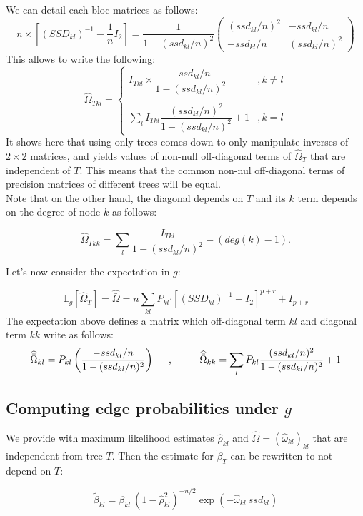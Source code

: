 \documentclass[11pt,a4paper]{article}
\newcommand{\Esp}{\mathds{E}}
\newcommand{\had}{\boldsymbol{\cdot}}
\begin{document}
We can detail each bloc matrices as follows:
\[
n\times [(SSD_{kl})^{-1} - \frac{1}{n}I_2] = \frac{1}{1-(ssd_{kl}/n)^2}
\left(\begin{array}{cc}
		(ssd_{kl}/n)^2   & -ssd_{kl}/n\\
		-ssd_{kl}/n& (ssd_{kl}/n)^2 
		\end{array}\right)
\]
This allows to write the following:
 \[ \boxed{\widehat{\Omega}_{Tkl}=\left\{\begin{array}{cl}I_{Tkl}
  \times\dfrac{ -ssd_{kl}/n}{1-(ssd_{kl}/n)^2} & ,k\neq l\\\\
 \sum_l I_{Tkl} \dfrac{(ssd_{kl}/n)^2}{1-(ssd_{kl}/n)^2} +1 & ,k=l
 \end{array}\right.
 }\]
It shows here that using only trees comes down to only manipulate inverses of $2\times 2$ matrices, and yields values of non-null off-diagonal terms of $\hat{\Omega}_T$ that are independent of $T$. This means that the common non-nul off-diagonal terms of precision matrices of different trees will be equal. \\

 Note that on the other hand, the diagonal depends on $T$ and its $k$ term depends on the degree of node $k$ as follows:

$$\widehat{\Omega}_{Tkk} =\sum_l \frac{I_{Tkl} }{1-(ssd_{kl}/n)^2} -(deg(k)-1).$$
 
Let's now consider the expectation in $g$:

$$\Esp_g[\widehat{\Omega}_T]= \widehat{\bar{\Omega}}= n\sum_{kl} P_{kl} \had [(SSD_{kl})^{-1} - I_2]^{p+r} + I_{p+r}$$
 The expectation above defines a matrix which off-diagonal term $kl$ and diagonal term $kk$ write as follows:
$$\widehat{\bar{\Omega}}_{kl} = P_{kl} \left(\frac{-ssd_{kl}/n}{1-(ssd_{kl}/n)^2} \right)\text{\hspace{0.5cm},\hspace{1cm}}\widehat{\bar{\Omega}}_{kk} = \sum_l P_{kl} \frac{(ssd_{kl}/n)^2}{1-(ssd_{kl}/n)^2} +1 $$
 
 \subsection{Computing edge probabilities under $g$}
We  provide with maximum likelihood estimates $\hat{\rho}_{kl}$ and $\widehat{\Omega}=(\hat{\omega}_{kl})_{kl}$ that are independent from tree $T$. Then the estimate for $\widetilde{\beta}_{T}$ can be rewritten to not depend on $T$:

   $$ \displaystyle \widetilde{\beta}_{kl} = \beta_{kl} \: (1-\hat{\rho}_{kl}^2)^{-n/2} \exp( -\hat{\omega}_{kl}\: ssd_{kl} ) $$
 
\end{document}
